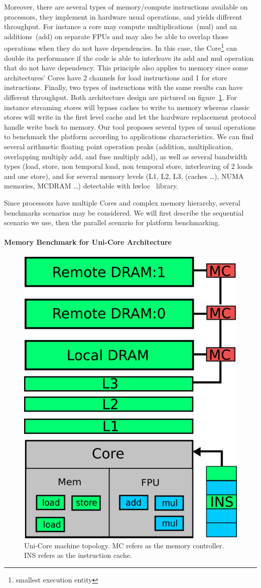 \documentclass[twoside,twocolumn,8pt]{extarticle}
\begin{document}
Moreover, there are several types of memory/compute instructions available on processors, they implement in hardware usual
operations, and yields different throughput. For instance a core may compute multiplications~(mul) and an additions~(add) on
separate FPUs and may also be able to overlap those operations when they do not have dependencies. In this case, the
Core\footnote{smallest execution entity} can double its performance if the code is able to interleave its add and mul operation
that do not have dependency. This principle also applies to memory since some architectures' Cores have 2 channels for load
instructions and 1 for store instructions. Finally, two types of instructions with the same results can have different throughput.
Both architecture design are pictured on figure~\ref{fig:unicore}.
For instance streaming stores will bypass caches to write to memory whereas classic stores will write in the first level cache and
let the hardware replacement protocol handle write back to memory.
Our tool proposes several types of usual operations to benchmark the platform according to applications characteristics.
We can find several arithmetic floating point operation peaks (addition, multiplication, overlapping multiply add, and fuse
multiply add), as well as several bandwidth types (load, store, non temporal load, non temporal store, interleaving of 2 loads and
one store), and for several memory levels (L1, L2, L3, (caches \dots), NUMA memories, MCDRAM \dots) detectable with
hwloc~\cite{6903671} library.

Since processors have multiple Cores and complex memory hierarchy, several benchmarks scenarios may be considered.
We will first describe the sequential scenario we use, then the parallel scenario for platform benchmarking.

\paragraph{Memory Benchmark for Uni-Core Architecture}
\begin{figure}
  \centering
  \includegraphics[width=.25\textwidth]{pictures/unicore}
  \caption{Uni-Core machine topology. MC refers as the memory controller. INS refers as the instruction cache.}
  \label{fig:unicore}
\end{figure}
\end{document}
